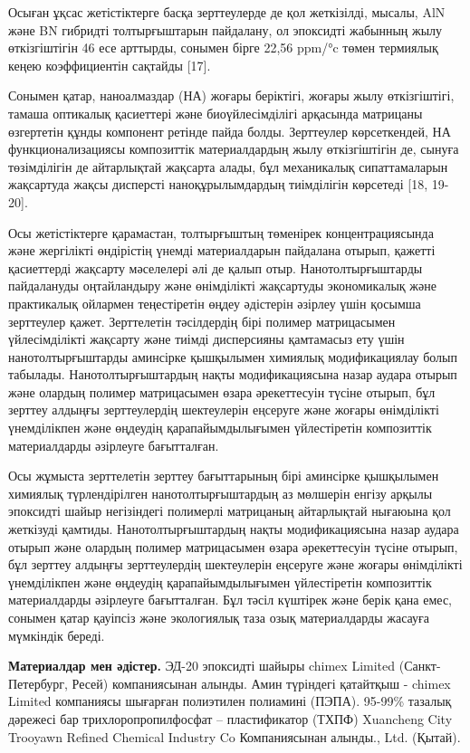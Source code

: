 \begin{multicols}{2}
Осыған ұқсас жетістіктерге басқа зерттеулерде де қол жеткізілді, мысалы,
AlN және BN гибридті толтырғыштарын пайдалану, ол эпоксидті жабынның
жылу өткізгіштігін 46 есе арттырды, сонымен бірге 22,56 ppm/°c төмен
термиялық кеңею коэффициентін сақтайды {[}17{]}.

Сонымен қатар, наноалмаздар (НА) жоғары беріктігі, жоғары жылу
өткізгіштігі, тамаша оптикалық қасиеттері және биоүйлесімділігі
арқасында матрицаны өзгертетін құнды компонент ретінде пайда болды.
Зерттеулер көрсеткендей, НА функционализациясы композиттік
материалдардың жылу өткізгіштігін де, сынуға төзімділігін де айтарлықтай
жақсарта алады, бұл механикалық сипаттамаларын жақсартуда жақсы
дисперсті наноқұрылымдардың тиімділігін көрсетеді {[}18, 19-20{]}.

Осы жетістіктерге қарамастан, толтырғыштың төменірек концентрациясында
және жергілікті өндірістің үнемді материалдарын пайдалана отырып,
қажетті қасиеттерді жақсарту мәселелері әлі де қалып отыр.
Нанотолтырғыштарды пайдалануды оңтайландыру және өнімділікті жақсартуды
экономикалық және практикалық ойлармен теңестіретін өңдеу әдістерін
әзірлеу үшін қосымша зерттеулер қажет. Зерттелетін тәсілдердің бірі
полимер матрицасымен үйлесімділікті жақсарту және тиімді дисперсияны
қамтамасыз ету үшін нанотолтырғыштарды аминсірке қышқылымен химиялық
модификациялау болып табылады. Нанотолтырғыштардың нақты модификациясына
назар аудара отырып және олардың полимер матрицасымен өзара әрекеттесуін
түсіне отырып, бұл зерттеу алдыңғы зерттеулердің шектеулерін еңсеруге
және жоғары өнімділікті үнемділікпен және өңдеудің қарапайымдылығымен
үйлестіретін композиттік материалдарды әзірлеуге бағытталған.

Осы жұмыста зерттелетін зерттеу бағыттарының бірі аминсірке қышқылымен
химиялық түрлендірілген нанотолтырғыштардың аз мөлшерін енгізу арқылы
эпоксидті шайыр негізіндегі полимерлі матрицаның айтарлықтай нығаюына
қол жеткізуді қамтиды. Нанотолтырғыштардың нақты модификациясына назар
аудара отырып және олардың полимер матрицасымен өзара әрекеттесуін
түсіне отырып, бұл зерттеу алдыңғы зерттеулердің шектеулерін еңсеруге
және жоғары өнімділікті үнемділікпен және өңдеудің қарапайымдылығымен
үйлестіретін композиттік материалдарды әзірлеуге бағытталған. Бұл тәсіл
күштірек және берік қана емес, сонымен қатар қауіпсіз және экологиялық
таза озық материалдарды жасауға мүмкіндік береді.

{\bfseries Материалдар мен әдістер.} ЭД-20 эпоксидті шайыры chimex Limited
(Санкт-Петербург, Ресей) компаниясынан алынды. Амин түріндегі қатайтқыш
- chimex Limited компаниясы шығарған полиэтилен полиамині (ПЭПА).
95-99\% тазалық дәрежесі бар трихлоропропилфосфат -- пластификатор
(ТХПФ) Xuancheng City Trooyawn Refined Chemical Industry Co
Компаниясынан алынды., Ltd. (Қытай).


\end{multicols}
